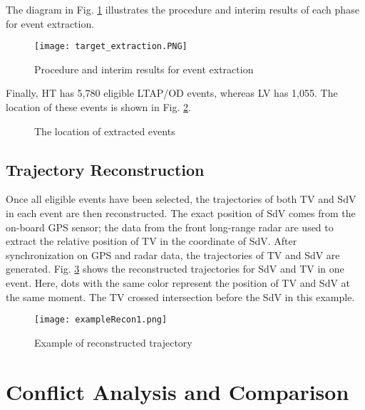 \documentclass[letterpaper, 10 pt, conference]{ieeeconf}
\begin{document}
The diagram in Fig. \ref{fig:eventextraction} illustrates the procedure and interim results of each phase for event extraction. 
    \begin{figure}         \texttt{[image: target\_extraction.PNG]}
          \caption{Procedure and interim results for event extraction}          \label{fig:eventextraction}
    \end{figure}
Finally, HT has 5,780 eligible LTAP/OD events, whereas LV has 1,055. The location of these events is shown in Fig. \ref{fig:RangeOfData}.
\begin{figure}[h!]
%
%
  \centering
  
  
     \caption{The location of extracted events}
     \label{fig:RangeOfData}
 \end{figure}


\subsection{Trajectory Reconstruction}
Once all eligible events have been selected, the trajectories of both TV and SdV in each event are then reconstructed. The exact position of SdV comes from the on-board GPS sensor; the data from the front long-range radar are used to extract the relative position of TV in the coordinate of SdV. %
After synchronization on GPS and radar data, the trajectories of TV and SdV are generated. Fig. \ref{fig:SDLV_latlong} shows the reconstructed trajectories for SdV and TV in one event. Here, dots with the same color represent the position of TV and SdV at the same moment. The TV crossed intersection before the SdV in this example.  
  \begin{figure}
  \texttt{[image: exampleRecon1.png]}
      \caption{Example of reconstructed trajectory}
      \label{fig:SDLV_latlong}
  \end{figure}


\section{Conflict Analysis and Comparison}
\end{document}
